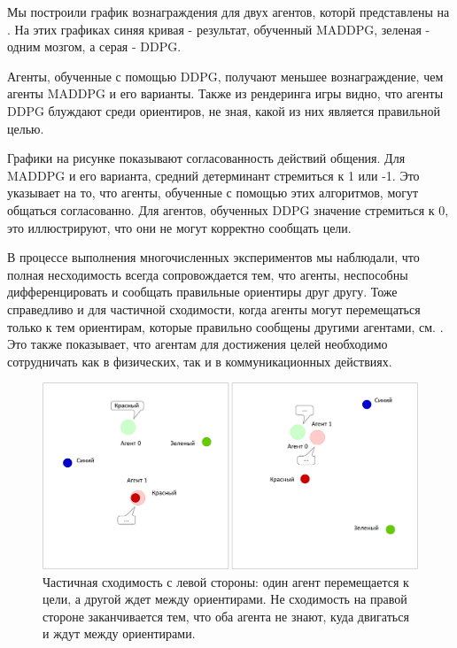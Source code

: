 Мы построили график вознаграждения для двух агентов, которй представлены на . На этих графиках синяя кривая - результат, обученный MADDPG, зеленая - одним мозгом, а серая - DDPG.

Агенты, обученные с помощью DDPG, получают меньшее вознаграждение, чем агенты MADDPG и его варианты. Также из рендеринга игры видно, что агенты DDPG блуждают среди ориентиров, не зная, какой из них является правильной целью.

Графики на рисунке  показывают согласованность действий общения. Для MADDPG и его варианта, средний детерминант стремиться к 1 или -1. Это указывает на то, что агенты, обученные с помощью этих алгоритмов, могут общаться согласованно. Для агентов, обученных DDPG значение стремиться к 0, это иллюстрируют, что они не могут корректно сообщать цели.

В процессе выполнения многочисленных экспериментов мы наблюдали, что полная несходимость всегда сопровождается тем, что агенты, неспособны дифференцировать и сообщать правильные ориентиры друг другу. Тоже справедливо и для частичной сходимости, когда агенты могут перемещаться только к тем ориентирам, которые правильно сообщены другими агентами, см. . Это также показывает, что агентам для достижения целей необходимо сотрудничать как в физических, так и в коммуникационных действиях.

\begin{figure}[ht!]
	\center
	\includegraphics [scale=0.45] {my_folder/images/ch5/results-sr-non-convergency.png}
	\caption{Частичная сходимость с левой стороны: один агент перемещается к цели, а другой ждет между ориентирами. Не сходимость на правой стороне заканчивается тем, что оба агента не знают, куда двигаться и ждут между ориентирами.}
	\label{fig:result-sr-non-convergency}
\end{figure}

